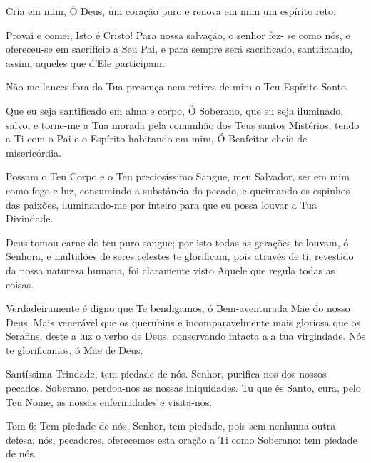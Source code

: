 \documentclass{subfiles}
\begin{document}
Cria em mim, Ó Deus, um coração puro e renova em mim um espírito reto.

Provai e comei, Isto é Cristo! Para nossa salvação, o senhor fez- se
como nós, e ofereceu-se em sacrifício a Seu Pai, e para sempre será sacrificado,
santificando, assim, aqueles que d’Ele participam.

Não me lances fora da Tua presença nem retires de mim o Teu Espírito Santo.

Que eu seja santificado em alma e corpo, Ó Soberano, que eu seja
iluminado, salvo, e torne-me a Tua morada pela comunhão dos Teus santos
Mistérios, tendo a Ti com o Pai e o Espírito habitando em mim, Ó Benfeitor
cheio de misericórdia.

\doxology{}

Possam o Teu Corpo e o Teu preciosíssimo Sangue, meu Salvador, ser em mim como
fogo e luz, consumindo a substância do pecado, e queimando os espinhos das
paixões, iluminando-me por inteiro para que eu possa louvar a Tua Divindade.

\nowandever{}

Deus tomou carne do teu puro sangue; por isto todas as gerações te
louvam, ó Senhora, e multidões de seres celestes te glorificam, pois através de
ti, revestido da nossa natureza humana, foi claramente visto Aquele que regula
todas as coisas.


Verdadeiramente é digno que Te bendigamos, ó Bem-aventurada Mãe
do nosso Deus. Mais venerável que os querubins e incomparavelmente mais
gloriosa que os Serafins, deste a luz o verbo de Deus, conservando intacta a a
tua virgindade. Nós te glorificamos, ó Mãe de Deus.

\trisagion{} \thrice{}

Santíssima Trindade, tem piedade de nós. Senhor, purifica-nos dos
nossos pecados. Soberano, perdoa-nos as nossas iniquidades. Tu que és Santo,
cura, pelo Teu Nome, as nossas enfermidades e visita-nos.

\mercy{} \thrice{}

\Doxology{}

\ourFather{}


Tom 6: Tem piedade de nós, Senhor, tem piedade, pois sem nenhuma outra
defesa, nós, pecadores, oferecemos esta oração a Ti como Soberano: tem
piedade de nós.
\end{document}
